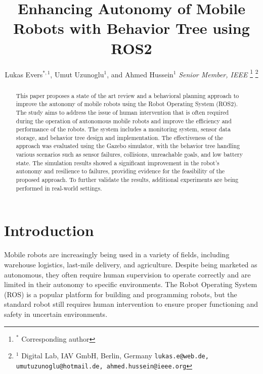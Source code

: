 \documentclass[letterpaper, 10pt, conference]{ieeeconf}
\begin{document}
\title{Enhancing Autonomy of Mobile Robots with Behavior Tree using ROS2}

\author{Lukas Evers$^{*,1}$, Umut Uzunoglu$^{1}$, and Ahmed Hussein$^{1}$ \textit{Senior Member, IEEE}%
    \thanks{$^{*}$ Corresponding author }%
    \thanks{$^{1}$ Digital Lab, IAV GmbH, Berlin, Germany \newline
		{\tt\small lukas.e@web.de, umutuzunoglu@hotmail.de, ahmed.hussein@ieee.org}}%
}

\maketitle
\pagestyle{empty}


\begin{abstract}

This paper proposes a state of the art review and a behavioral planning approach to improve the autonomy of mobile robots using the Robot Operating System (ROS2). The study aims to address the issue of human intervention that is often required during the operation of autonomous mobile robots and improve the efficiency and performance of the robots. The system includes a monitoring system, sensor data storage, and behavior tree design and implementation. The effectiveness of the approach was evaluated using the Gazebo simulator, with the behavior tree handling various scenarios such as sensor failures, collisions, unreachable goals, and low battery state. The simulation results showed a significant improvement in the robot's autonomy and resilience to failures, providing evidence for the feasibility of the proposed approach. To further validate the results, additional experiments are being performed in real-world settings.

\end{abstract}


\section{Introduction}
\label{sec:Introduction}

Mobile robots are increasingly being used in a variety of fields, including warehouse logistics, last-mile delivery, and agriculture. Despite being marketed as autonomous, they often require human supervision to operate correctly and are limited in their autonomy to specific environments. The Robot Operating System (ROS) is a popular platform for building and programming robots, but the standard robot still requires human intervention to ensure proper functioning and safety in uncertain environments.
\end{document}
